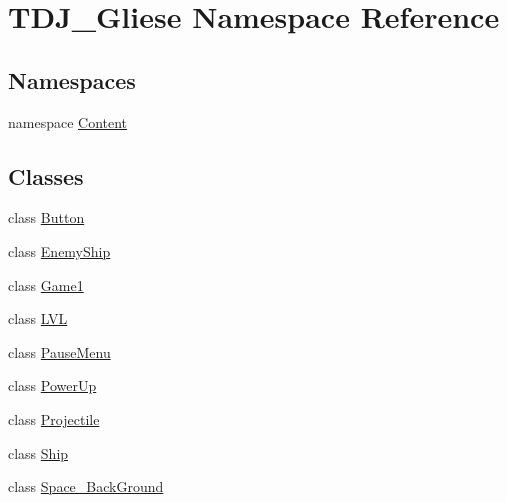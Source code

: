 \hypertarget{namespace_t_d_j___gliese}{}\section{T\+D\+J\+\_\+\+Gliese Namespace Reference}
\label{namespace_t_d_j___gliese}
\subsection*{Namespaces}
\begin{DoxyCompactItemize}
\item 
namespace \hyperlink{namespace_t_d_j___gliese_1_1_content}{Content}
\end{DoxyCompactItemize}
\subsection*{Classes}
\begin{DoxyCompactItemize}
\item 
class \hyperlink{class_t_d_j___gliese_1_1_button}{Button}
\item 
class \hyperlink{class_t_d_j___gliese_1_1_enemy_ship}{Enemy\+Ship}
\item 
class \hyperlink{class_t_d_j___gliese_1_1_game1}{Game1}
\item 
class \hyperlink{class_t_d_j___gliese_1_1_l_v_l}{L\+VL}
\item 
class \hyperlink{class_t_d_j___gliese_1_1_pause_menu}{Pause\+Menu}
\item 
class \hyperlink{class_t_d_j___gliese_1_1_power_up}{Power\+Up}
\item 
class \hyperlink{class_t_d_j___gliese_1_1_projectile}{Projectile}
\item 
class \hyperlink{class_t_d_j___gliese_1_1_ship}{Ship}
\item 
class \hyperlink{class_t_d_j___gliese_1_1_space___back_ground}{Space\+\_\+\+Back\+Ground}
\end{DoxyCompactItemize}
